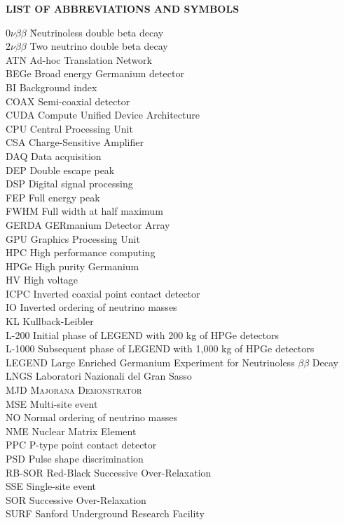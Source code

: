 {}

\begin{center}
{\normalfont \textbf{LIST OF ABBREVIATIONS AND SYMBOLS}}
\end{center}

\newcommand{\Ab}[2]{\noindent  #1 \> #2 \\}
\newcommand{\Abi}[2]{\noindent #1 \hspace{1.5cm} \= #2 \\}

\begin{tabbing}
\Abi{$0\nu\beta\beta$}{Neutrinoless double beta decay}
\Ab{$2\nu\beta\beta$}{Two neutrino double beta decay}
\Ab{ATN}{Ad-hoc Translation Network}
\Ab{BEGe}{Broad energy Germanium detector}
\Ab{BI}{Background index}
\Ab{COAX}{Semi-coaxial detector}
\Ab{CUDA} {Compute Unified Device Architecture}
\Ab{CPU}{Central Processing Unit}
\Ab{CSA} {Charge-Sensitive Amplifier}
\Ab{DAQ}{Data acquisition}
\Ab{DEP}{Double escape peak}
\Ab{DSP}{Digital signal processing}
\Ab{FEP}{Full energy peak}
\Ab{FWHM}{Full width at half maximum}
\Ab{GERDA}{GERmanium Detector Array}
\Ab{GPU}{Graphics Processing Unit}
\Ab{HPC}{High performance computing}
\Ab{HPGe}{High purity Germanium}
\Ab{HV}{High voltage}
\Ab{ICPC}{Inverted coaxial point contact detector}
\Ab{IO}{Inverted ordering of neutrino masses}
\Ab{KL}{Kullback-Leibler} 
\Ab{L-200}{Initial phase of LEGEND with 200 kg of HPGe detectors}
\Ab{L-1000}{Subsequent phase of LEGEND with 1,000 kg of HPGe detectors}
\Ab{LEGEND}{Large Enriched Germanium Experiment for Neutrinoless $\beta\beta$ Decay}
\Ab{LNGS}{Laboratori Nazionali del Gran Sasso}
\Ab{MJD}{\textsc{Majorana Demonstrator}}
\Ab{MSE}{Multi-site event}
\Ab{NO}{Normal ordering of neutrino masses}
\Ab{NME}{Nuclear Matrix Element}
\Ab{PPC}{P-type point contact detector}
\Ab{PSD}{Pulse shape discrimination}
\Ab{RB-SOR} {Red-Black Successive Over-Relaxation}
\Ab{SSE}{Single-site event}
\Ab{SOR} {Successive Over-Relaxation}
\Ab{SURF}{Sanford Underground Research Facility}
\end{tabbing}

\clearpage
